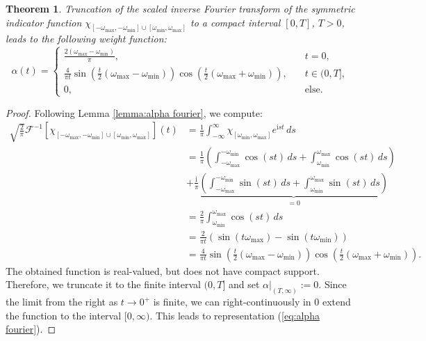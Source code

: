 \documentclass[a4paper,11pt,bibliography=totoc,listof=totoc,headinclude=true,cleardoublepage=empty,oneside]{scrbook}
\newtheorem{theorem}{Theorem}[chapter]
\renewcommand{\i}{\mathrm{i}}
\newcommand{\F}{\mathcal{F}}
\renewcommand{\eqref}[1]{(\ref{#1})}
\begin{document}
\begin{theorem}
    Truncation of the scaled inverse Fourier transform of the symmetric indicator function $\chi_{\left[-\omega_{\max}, -\omega_{\min}\right]\cup\left[\omega_{\min}, \omega_{\max}\right]}$ to a compact interval $[0, T]$, $T>0$, leads to the following weight function:
    \begin{equation}\label{eq:alpha fourier}
        \alpha(t) = \begin{cases}
            \frac{2\left(\omega_{\max} - \omega_{\min}\right)}{\pi}, \quad & t = 0, \\
            \frac{4}{\pi t} \sin\left(\frac{t}{2}\left(\omega_{\max}-\omega_{\min} \right)\right)\cos\left(\frac{t}{2}\left(\omega_{\max}+\omega_{\min} \right)\right), \quad & t \in (0, T], \\
            0, \quad & \text{else.}
        \end{cases}
    \end{equation}
\end{theorem}
\begin{proof}
    Following Lemma \ref{lemma:alpha fourier}, we compute:
    \begin{align*}
        \sqrt{\frac{2}{\pi}} \F^{-1}\left[\chi_{\left[-\omega_{\max}, -\omega_{\min}\right]\cup\left[\omega_{\min}, \omega_{\max}\right]}\right](t) &= \frac{1}{\pi} \int_{-\infty}^\infty \chi_{\left[\omega_{\min}, \omega_{\max}\right]} e^{\i st} \, ds \\ 
        & = \frac{1}{\pi} \left( \int_{-\omega_{\max}}^{-\omega_{\min}} \cos(st) \, ds + \int_{\omega_{\min}}^{\omega_{\max}} \cos(st) \, ds\right) \\ &+ \frac{\i}{\pi} \underbrace{\left(\int_{-\omega_{\max}}^{-\omega_{\min}} \sin(st) \, ds + \int_{\omega_{\min}}^{\omega_{\max}} \sin(st) \, ds \right)}_{=0} \\
        &= \frac{2}{\pi}\int_{\omega_{\min}}^{\omega_{\max}} \cos(st) \, ds \\
        &= \frac{2}{\pi t} \left(\sin\left(t\omega_{\max}\right) - \sin\left(t\omega_{\min}\right)\right) \\
        &= \frac{4}{\pi t} \sin\left(\frac{t}{2}\left(\omega_{\max}-\omega_{\min} \right)\right)\cos\left(\frac{t}{2}\left(\omega_{\max}+\omega_{\min} \right)\right).
    \end{align*}
    The obtained function is real-valued, but does not have compact support. Therefore, we truncate it to the finite interval $(0, T]$ and set $\alpha|_{(T, \infty)} := 0$. Since the limit from the right as $t\rightarrow 0^+$ is finite, we can right-continuously in 0 extend the function to the interval $[0, \infty)$. This leads to representation \eqref{eq:alpha fourier}.
\end{proof}
\end{document}
